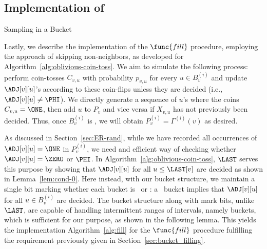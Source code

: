 \subsection{Implementation of }
\label{sec:fill_implement}

\begin{algorithm}[H]
\caption{Sampling in a Bucket}
\begin{algorithmic}
        \Repeat
            \EndIf
\EndProcedure
\end{algorithmic}
\label{alg:fill}
\end{algorithm}

Lastly, we describe the implementation of the $\func{fill}$ procedure, employing the approach of skipping non-neighbors, as developed for Algorithm~\ref{alg:oblivious-coin-toss}. We aim to simulate the following process: perform coin-tosses $C_{v,u}$ with probability $p_{v,u}$ for every $u \in B_v^{(i)}$ and update $\ADJ[v][u]$'s according to these coin-flips unless they are decided (i.e., $\ADJ[v][u] \neq \PHI$). We directly generate a sequence of $u$'s where the coins $C_{v,u} = \ONE$, then add $u$ to $P_v$ and vice versa if $X_{v,u}$ has not previously been decided. Thus, once $B_v^{(i)}$ is \filled, we will obtain $P_v^{(i)} = \Gamma^{(i)}(v)$ as desired.

As discussed in Section~\ref{sec:ER-rand}, while we have recorded all occurrences of $\ADJ[v][u]=\ONE$ in $P_v^{(i)}$, we need and efficient way of checking whether $\ADJ[v][u] = \ZERO$ or $\PHI$. In Algorithm~\ref{alg:oblivious-coin-toss}, $\LAST$ serves this purpose by showing that $\ADJ[v][u]$ for all $u \leq \LAST[v]$ are decided as shown in Lemma~\ref{lem:cond-0}. Here instead, with our bucket structure, we maintain a single bit marking whether each bucket is \filled~or \unfilled: a \filled~bucket implies that $\ADJ[v][u]$ for all $u \in B_v^{(i)}$ are decided. The bucket structure along with mark bits, unlike $\LAST$, are capable of handling intermittent ranges of intervals, namely buckets, which is sufficient for our purpose, as shown in the following lemma. This yields the implementation Algorithm~\ref{alg:fill} for the $\func{fill}$ procedure fulfilling the requirement previously given in Section~\ref{sec:bucket_filling}. 

